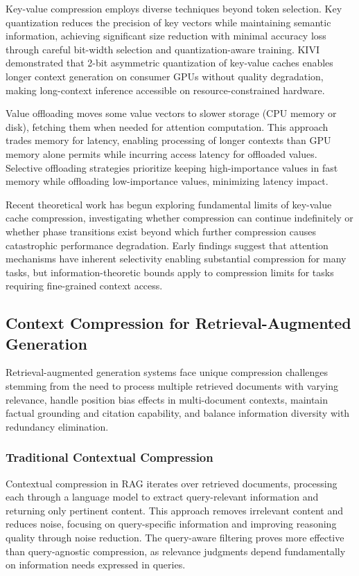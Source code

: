 Key-value compression employs diverse techniques beyond token selection. Key quantization reduces the precision of key vectors while maintaining semantic information, achieving significant size reduction with minimal accuracy loss through careful bit-width selection and quantization-aware training. KIVI demonstrated that 2-bit asymmetric quantization of key-value caches enables longer context generation on consumer GPUs without quality degradation, making long-context inference accessible on resource-constrained hardware.

Value offloading moves some value vectors to slower storage (CPU memory or disk), fetching them when needed for attention computation. This approach trades memory for latency, enabling processing of longer contexts than GPU memory alone permits while incurring access latency for offloaded values. Selective offloading strategies prioritize keeping high-importance values in fast memory while offloading low-importance values, minimizing latency impact.

Recent theoretical work has begun exploring fundamental limits of key-value cache compression, investigating whether compression can continue indefinitely or whether phase transitions exist beyond which further compression causes catastrophic performance degradation. Early findings suggest that attention mechanisms have inherent selectivity enabling substantial compression for many tasks, but information-theoretic bounds apply to compression limits for tasks requiring fine-grained context access.

\subsection{Context Compression for Retrieval-Augmented Generation}

Retrieval-augmented generation systems face unique compression challenges stemming from the need to process multiple retrieved documents with varying relevance, handle position bias effects in multi-document contexts, maintain factual grounding and citation capability, and balance information diversity with redundancy elimination.

\subsubsection{Traditional Contextual Compression}

Contextual compression in RAG iterates over retrieved documents, processing each through a language model to extract query-relevant information and returning only pertinent content. This approach removes irrelevant content and reduces noise, focusing on query-specific information and improving reasoning quality through noise reduction. The query-aware filtering proves more effective than query-agnostic compression, as relevance judgments depend fundamentally on information needs expressed in queries.


